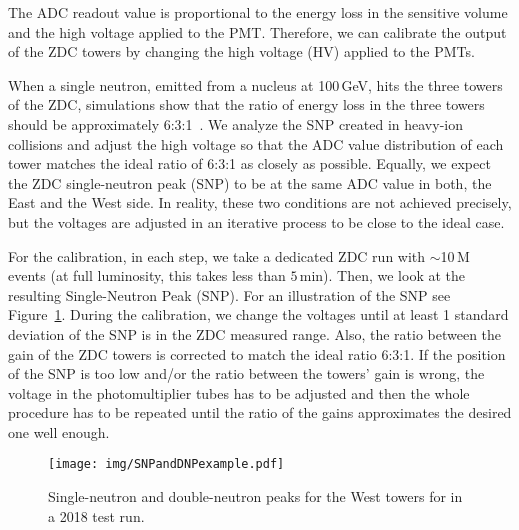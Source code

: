 The ADC readout value is proportional to the energy loss in the sensitive volume and the high voltage applied to the PMT\@. Therefore, we can calibrate the output of the ZDC towers by changing the high voltage (HV) applied to the PMTs. 

When a single neutron, emitted from a nucleus at 100$\,$GeV, hits the three towers of the ZDC, simulations show that the ratio of energy loss
in the three towers should be 
approximately 6:3:1~\cite{ZDCphysics}\@. We analyze the SNP created in heavy-ion collisions and adjust the high voltage so that the ADC value 
distribution of each tower matches the ideal ratio of 6:3:1 as closely as possible. Equally, we expect the ZDC 
single-neutron peak (SNP) to
be at the same ADC value in both, the East and the West side. In reality, these two conditions are not achieved precisely, but the voltages are adjusted in an iterative process to be close to the ideal case.



% 



For the calibration, in each step, we take a dedicated ZDC run with
$\sim$10$\,$M events (at full luminosity, this takes less than $5\,$min). Then, we
look at the resulting Single-Neutron Peak (SNP).
For an illustration of the SNP see Figure~\ref{SNPillustration}\@.
During the calibration, we change the voltages until at least 1 standard deviation of the SNP is in the ZDC measured
range. Also, the ratio between the gain of the ZDC towers is corrected to match the ideal ratio 6:3:1\@. If the position of the SNP is too low and/or the ratio between the towers' gain is wrong,
the voltage in the photomultiplier tubes has to be adjusted and then the whole procedure
has to be repeated until the ratio of the gains approximates the desired one well enough.


\begin{figure}[!htb]
\begin{center}
\texttt{[image: img/SNPandDNPexample.pdf]}
\end{center}
\caption{\label{SNPillustration} Single-neutron and double-neutron peaks for the West towers for in a 2018 test run.}

\end{figure}

